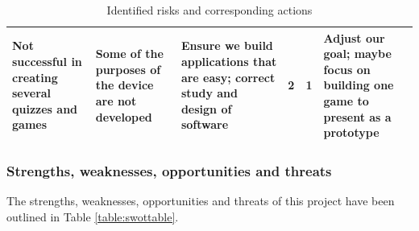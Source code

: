 \documentclass{article}
\begin{document}
\begin{table}[h]
\begin{center}
\begin{small}
\begin{tabular}{|p{3cm}|p{3cm}|p{3cm}|p{1cm}|p{1.2cm}|p{3cm}|}
Not successful in creating several quizzes and games                                              & Some of the purposes of the device are not developed                                                            & Ensure we build applications that are easy; correct study and design of software                                                                                                                          & 2        & 1          & Adjust our goal; maybe focus on building one game to present as a prototype                                                                       \\ \hline
\end{tabular}
\end{small}
\end{center}
\caption{Identified risks and corresponding actions}
\label{table:riskstable}
\end{table}

\subsubsection{Strengths, weaknesses, opportunities and threats}

The strengths, weaknesses, opportunities and threats of this project have been outlined in Table \ref{table:swottable}.
\end{document}
